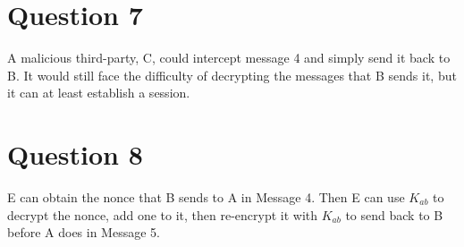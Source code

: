 \documentclass[a4paper]{article}
\begin{document}
\section{Question 7}
A malicious third-party, C, could intercept message 4 and simply send it back to B. It would still face the difficulty of decrypting the messages that B sends it, but it can at least establish a session.

\section{Question 8}
E can obtain the nonce that B sends to A in Message 4. Then E can use $K_{ab}$ to decrypt the nonce, add one to it, then re-encrypt it with $K_{ab}$ to send back to B before A does in Message 5.
\end{document}
